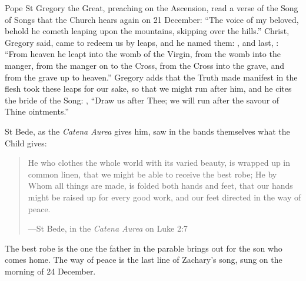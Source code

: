 Pope St Gregory the Great, preaching on the Ascension, read a verse of the Song
of Songs that the Church hears again on 21 December: ``The voice of my beloved,
behold he cometh leaping upon the mountains, skipping over the hills.'' Christ,
Gregory said, came to redeem us by leaps, and he named them:
, and last, : ``From heaven he leapt into the womb of the Virgin, from the womb into
the manger, from the manger on to the Cross, from the Cross into the grave, and
from the grave up to heaven.'' Gregory adds that the
Truth made manifest in the flesh took these leaps for our sake, so that we
might run after him, and he cites the bride of the Song:
, ``Draw us after
Thee; we will run after the savour of Thine ointments.''

St Bede, as the \emph{Catena Aurea} gives him, saw in the bands themselves what the
Child gives:

\begin{quote}
He who clothes the whole world with its varied beauty, is wrapped up in common
linen, that we might be able to receive the best robe; He by Whom all things are
made, is folded both hands and feet, that our hands might be raised up for every
good work, and our feet directed in the way of peace.\par
{\smallskip\noindent\small ---St Bede, in the \emph{Catena Aurea} on Luke 2:7\par}
\end{quote}

\noindent The best robe is the one the father in the parable brings out for the
son who comes home. The way of peace is the last line of Zachary's song, sung
on the morning of 24 December.
